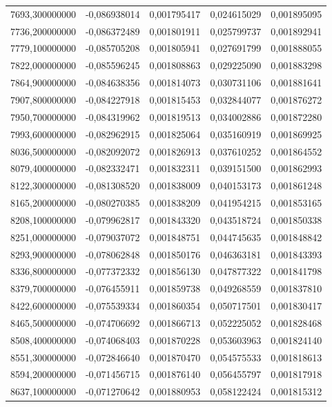 \begin{longtable}{rrrrr}
7693,300000000 & -0,086938014 & 0,001795417 & 0,024615029 & 0,001895095\\
7736,200000000 & -0,086372489 & 0,001801911 & 0,025799737 & 0,001892941\\
7779,100000000 & -0,085705208 & 0,001805941 & 0,027691799 & 0,001888055\\
7822,000000000 & -0,085596245 & 0,001808863 & 0,029225090 & 0,001883298\\
7864,900000000 & -0,084638356 & 0,001814073 & 0,030731106 & 0,001881641\\
7907,800000000 & -0,084227918 & 0,001815453 & 0,032844077 & 0,001876272\\
7950,700000000 & -0,084319962 & 0,001819513 & 0,034002886 & 0,001872280\\
7993,600000000 & -0,082962915 & 0,001825064 & 0,035160919 & 0,001869925\\
8036,500000000 & -0,082092072 & 0,001826913 & 0,037610252 & 0,001864552\\
8079,400000000 & -0,082332471 & 0,001832311 & 0,039151500 & 0,001862993\\
8122,300000000 & -0,081308520 & 0,001838009 & 0,040153173 & 0,001861248\\
8165,200000000 & -0,080270385 & 0,001838209 & 0,041954215 & 0,001853165\\
8208,100000000 & -0,079962817 & 0,001843320 & 0,043518724 & 0,001850338\\
8251,000000000 & -0,079037072 & 0,001848751 & 0,044745635 & 0,001848842\\
8293,900000000 & -0,078062848 & 0,001850176 & 0,046363181 & 0,001843393\\
8336,800000000 & -0,077372332 & 0,001856130 & 0,047877322 & 0,001841798\\
8379,700000000 & -0,076455911 & 0,001859738 & 0,049268559 & 0,001837810\\
8422,600000000 & -0,075539334 & 0,001860354 & 0,050717501 & 0,001830417\\
8465,500000000 & -0,074706692 & 0,001866713 & 0,052225052 & 0,001828468\\
8508,400000000 & -0,074068403 & 0,001870228 & 0,053603963 & 0,001824140\\
8551,300000000 & -0,072846640 & 0,001870470 & 0,054575533 & 0,001818613\\
8594,200000000 & -0,071456715 & 0,001876140 & 0,056455797 & 0,001817918\\
8637,100000000 & -0,071270642 & 0,001880953 & 0,058122424 & 0,001815312\\

\end{longtable}
